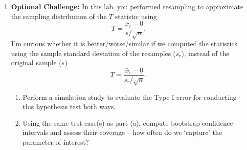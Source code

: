 \documentclass{article}\usepackage[]{graphicx}\usepackage[]{xcolor}
\makeatletter
\newcommand{\hlnum}[1]{\textcolor[rgb]{0.686,0.059,0.569}{#1}}%
\newcommand{\hlcom}[1]{\textcolor[rgb]{0.678,0.584,0.686}{\textit{#1}}}%
\newcommand{\hlopt}[1]{\textcolor[rgb]{0,0,0}{#1}}%
\newcommand{\hldef}[1]{\textcolor[rgb]{0.345,0.345,0.345}{#1}}%
\newcommand{\hlkwa}[1]{\textcolor[rgb]{0.161,0.373,0.58}{\textbf{#1}}}%
\newcommand{\hlkwb}[1]{\textcolor[rgb]{0.69,0.353,0.396}{#1}}%
\newcommand{\hlkwd}[1]{\textcolor[rgb]{0.737,0.353,0.396}{\textbf{#1}}}%
\newenvironment{kframe}{%
 \def\at@end@of@kframe{}%
 \ifinner\ifhmode%
  \def\at@end@of@kframe{\end{minipage}}%
  \begin{minipage}{\columnwidth}%
 \fi\fi%
 \def\FrameCommand##1{\hskip\@totalleftmargin \hskip-\fboxsep
 \colorbox{shadecolor}{##1}\hskip-\fboxsep
     \hskip-\linewidth \hskip-\@totalleftmargin \hskip\columnwidth}%
 \MakeFramed {\advance\hsize-\width
   \@totalleftmargin\z@ \linewidth\hsize
   \@setminipage}}%
 {\par\unskip\endMakeFramed%
 \at@end@of@kframe}
\newenvironment{knitrout}{}{} %
\makeatother
\begin{document}
\begin{enumerate}
\begin{enumerate}
\begin{knitrout}
\begin{kframe}
\begin{alltt}
  \hlkwa{if} \hldef{(p.val} \hlopt{<} \hlnum{0.05}\hldef{)} \hlkwa{break}
  \hldef{mu.upper} \hlkwb{<-} \hldef{mu.upper} \hlopt{+} \hldef{mu0.iterate}
\hldef{\}}

\hldef{ciR_diff} \hlkwb{<-} \hlkwd{c}\hldef{(mu.lower, mu.upper)}
\hldef{ciR_diff}  \hlcom{# randomization 95 CI for diff}
\end{alltt}
\begin{verbatim}
## [1] 0.2752475 0.4446475
\end{verbatim}
\end{kframe}
\end{knitrout}
\end{enumerate}
\item \textbf{Optional Challenge:} In this lab, you performed resampling to 
approximate the sampling distribution of the $T$ statistic using
\[T = \frac{\bar{x}_r - 0}{s/\sqrt{n}}.\]
I'm curious whether it is better/worse/similar if we computed the statistics
using the sample standard deviation of the resamples ($s_r$), instead of the 
original sample ($s$)
  \[T = \frac{\bar{x}_r - 0}{s_r/\sqrt{n}}.\]
\begin{enumerate}
  \item Perform a simulation study to evaluate the Type I error for conducting this
hypothesis test both ways.
  \item Using the same test case(s) as part (a), compute bootstrap confidence 
  intervals and assess their coverage -- how often do we `capture' the parameter
of interest?
\end{enumerate}
\end{enumerate}

\end{document}

